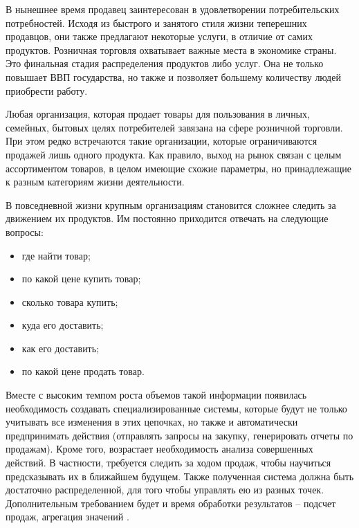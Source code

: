 В нынешнее время продавец заинтересован в удовлетворении потребительских потребностей. Исходя из быстрого и занятого стиля жизни теперешних продавцов, они также предлагают некоторые услуги, в отличие от самих продуктов. Розничная торговля охватывает важные места в экономике страны. Это финальная стадия распределения продуктов либо услуг. Она не только повышает ВВП государства, но также и позволяет большему количеству людей приобрести работу.

Любая организация, которая продает товары для пользования в личных, семейных, бытовых целях потребителей завязана на сфере розничной торговли. При этом редко встречаются такие организации, которые ограничиваются продажей лишь одного продукта. Как правило, выход на рынок связан с целым ассортиментом товаров, в целом имеющие схожие параметры, но принадлежащие к разным категориям жизни деятельности.

В повседневной жизни крупным организациям становится сложнее следить за движением их продуктов. Им постоянно приходится отвечать на следующие вопросы:
\begin{itemize}
  \item где найти товар;
  \item по какой цене купить товар;
  \item сколько товара купить;
  \item куда его доставить;
  \item как его доставить;
  \item по какой цене продать товар.
\end{itemize}

Вместе с высоким темпом роста объемов такой информации появилась необходимость создавать специализированные системы, которые будут не только учитывать все изменения в этих цепочках, но также и автоматически предпринимать действия (отправлять запросы на закупку, генерировать отчеты по продажам). Кроме того, возрастает необходимость анализа совершенных действий. В частности, требуется следить за ходом продаж, чтобы научиться предсказывать их в ближайшем будущем. Также полученная система должна быть достаточно распределенной, для того чтобы управлять ею из разных точек. Дополнительным требованием будет и время обработки результатов – подсчет продаж, агрегация значений \cite{retail_software}.
